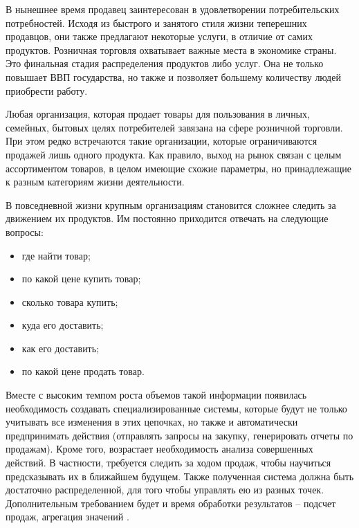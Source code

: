 В нынешнее время продавец заинтересован в удовлетворении потребительских потребностей. Исходя из быстрого и занятого стиля жизни теперешних продавцов, они также предлагают некоторые услуги, в отличие от самих продуктов. Розничная торговля охватывает важные места в экономике страны. Это финальная стадия распределения продуктов либо услуг. Она не только повышает ВВП государства, но также и позволяет большему количеству людей приобрести работу.

Любая организация, которая продает товары для пользования в личных, семейных, бытовых целях потребителей завязана на сфере розничной торговли. При этом редко встречаются такие организации, которые ограничиваются продажей лишь одного продукта. Как правило, выход на рынок связан с целым ассортиментом товаров, в целом имеющие схожие параметры, но принадлежащие к разным категориям жизни деятельности.

В повседневной жизни крупным организациям становится сложнее следить за движением их продуктов. Им постоянно приходится отвечать на следующие вопросы:
\begin{itemize}
  \item где найти товар;
  \item по какой цене купить товар;
  \item сколько товара купить;
  \item куда его доставить;
  \item как его доставить;
  \item по какой цене продать товар.
\end{itemize}

Вместе с высоким темпом роста объемов такой информации появилась необходимость создавать специализированные системы, которые будут не только учитывать все изменения в этих цепочках, но также и автоматически предпринимать действия (отправлять запросы на закупку, генерировать отчеты по продажам). Кроме того, возрастает необходимость анализа совершенных действий. В частности, требуется следить за ходом продаж, чтобы научиться предсказывать их в ближайшем будущем. Также полученная система должна быть достаточно распределенной, для того чтобы управлять ею из разных точек. Дополнительным требованием будет и время обработки результатов – подсчет продаж, агрегация значений \cite{retail_software}.
